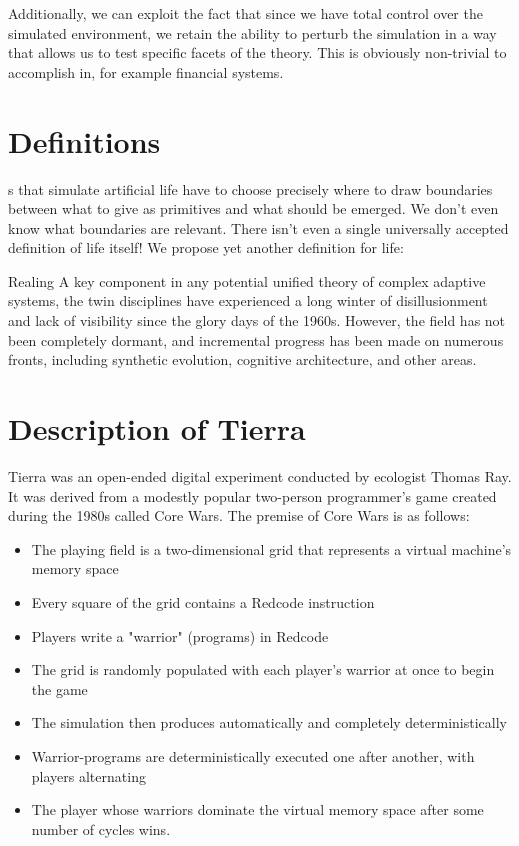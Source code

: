 \documentclass{article}
\begin{document}
Additionally, we can exploit the fact that since we have total control over the simulated environment, we retain the ability to perturb the simulation in a way that allows us to test specific facets of the theory. This is obviously non-trivial to accomplish in, for example financial systems.

\section{Definitions}

s that simulate artificial life have to choose precisely where to draw boundaries between what to give as primitives and what should be emerged. We don't even know what boundaries are relevant. There isn't even a single universally accepted definition of life itself! We propose yet another definition for life:

Realing A key component in any potential unified theory of complex adaptive systems, the twin disciplines have experienced a long winter of disillusionment and lack of visibility since the glory days of the 1960s. However, the field has not been completely dormant, and incremental progress has been made on numerous fronts, including synthetic evolution, cognitive architecture, and other areas.

\section{Description of Tierra}
Tierra was an open-ended digital experiment conducted by ecologist Thomas Ray. It was derived from a modestly popular two-person programmer's game created during the 1980s called Core Wars. The premise of Core Wars is as follows:

\begin{itemize}
\item The playing field is a two-dimensional grid that represents a virtual machine's memory space
\item Every square of the grid contains a Redcode instruction
\item Players write a "warrior" (programs) in Redcode
\item The grid is randomly populated with each player's warrior at once to begin the game
\item The simulation then produces automatically and completely deterministically
\item Warrior-programs are deterministically executed one after another, with players alternating 
\item The player whose warriors dominate the virtual memory space after some number of cycles wins.
\end{itemize}
\end{document}
